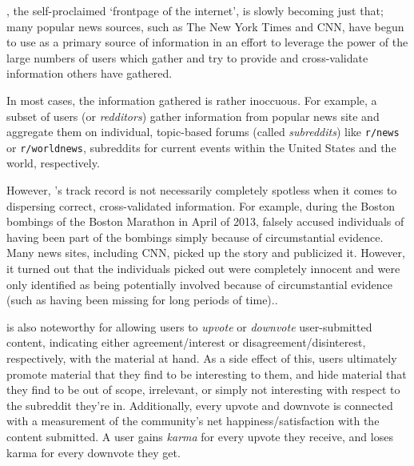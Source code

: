 \reddit{}, the self-proclaimed `frontpage of the internet', is slowly becoming
just that; many popular news sources, such as The New York Times and CNN, have
begun to use \reddit{} as a primary source of information in an effort to
leverage the power of the large numbers of users which gather and try to provide
and cross-validate information others have gathered.

In most cases, the information gathered is rather inoccuous. For example, a
subset of \reddit{} users (or \textit{redditors}) gather information from
popular news site and aggregate them on individual, topic-based forums (called
\textit{subreddits}) like \texttt{r/news} or \texttt{r/worldnews}, subreddits
for current events within the United States and the world, respectively.

However, \reddit{}'s track record is not necessarily completely spotless when it
comes to dispersing correct, cross-validated information. For example, during
the Boston bombings of the Boston Marathon in April of 2013, \reddit{} falsely
accused individuals of having been part of the bombings simply because of
circumstantial evidence. Many news sites, including CNN, picked up the story and
publicized it. However, it turned out that the individuals \reddit{} picked out
were completely innocent and were only identified as being potentially involved
because of circumstantial evidence (such as having been missing for long periods
of time).\cite{Potts:2013:IRC:2507065.2507079}.

\reddit{} is also noteworthy for allowing users to \textit{upvote} or
\textit{downvote} user-submitted content, indicating either agreement/interest
or disagreement/disinterest, respectively, with the material at hand. As a side
effect of this, users ultimately promote material that they find to be
interesting to them, and hide material that they find to be out of scope,
irrelevant, or simply not interesting with respect to the subreddit they're
in.\cite{Gilbert:2013:WUR:2441776.2441866} Additionally, every upvote and
downvote is connected with a measurement of the community's net
happiness/satisfaction with the content submitted. A user gains \textit{karma}
for every upvote they receive, and loses karma for every downvote they get.
